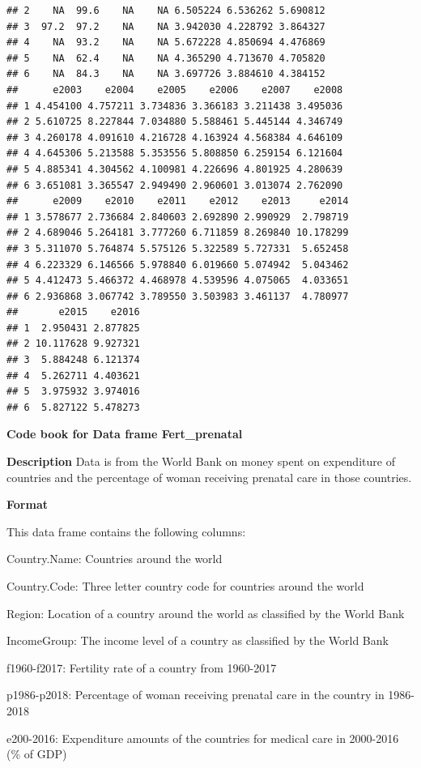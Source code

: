 \documentclass[
]{book}
\begin{document}
\begin{verbatim}
## 2    NA  99.6    NA    NA 6.505224 6.536262 5.690812
## 3  97.2  97.2    NA    NA 3.942030 4.228792 3.864327
## 4    NA  93.2    NA    NA 5.672228 4.850694 4.476869
## 5    NA  62.4    NA    NA 4.365290 4.713670 4.705820
## 6    NA  84.3    NA    NA 3.697726 3.884610 4.384152
##      e2003    e2004    e2005    e2006    e2007    e2008
## 1 4.454100 4.757211 3.734836 3.366183 3.211438 3.495036
## 2 5.610725 8.227844 7.034880 5.588461 5.445144 4.346749
## 3 4.260178 4.091610 4.216728 4.163924 4.568384 4.646109
## 4 4.645306 5.213588 5.353556 5.808850 6.259154 6.121604
## 5 4.885341 4.304562 4.100981 4.226696 4.801925 4.280639
## 6 3.651081 3.365547 2.949490 2.960601 3.013074 2.762090
##      e2009    e2010    e2011    e2012    e2013     e2014
## 1 3.578677 2.736684 2.840603 2.692890 2.990929  2.798719
## 2 4.689046 5.264181 3.777260 6.711859 8.269840 10.178299
## 3 5.311070 5.764874 5.575126 5.322589 5.727331  5.652458
## 4 6.223329 6.146566 5.978840 6.019660 5.074942  5.043462
## 5 4.412473 5.466372 4.468978 4.539596 4.075065  4.033651
## 6 2.936868 3.067742 3.789550 3.503983 3.461137  4.780977
##       e2015    e2016
## 1  2.950431 2.877825
## 2 10.117628 9.927321
## 3  5.884248 6.121374
## 4  5.262711 4.403621
## 5  3.975932 3.974016
## 6  5.827122 5.478273
\end{verbatim}

\textbf{Code book for Data frame Fert\_prenatal}

\textbf{Description}
Data is from the World Bank on money spent on expenditure of countries and the percentage of woman receiving prenatal care in those countries.

\textbf{Format}

This data frame contains the following columns:

Country.Name: Countries around the world

Country.Code: Three letter country code for countries around the world

Region: Location of a country around the world as classified by the World Bank

IncomeGroup: The income level of a country as classified by the World Bank

f1960-f2017: Fertility rate of a country from 1960-2017

p1986-p2018: Percentage of woman receiving prenatal care in the country in 1986-2018

e200-2016: Expenditure amounts of the countries for medical care in 2000-2016 (\% of GDP)
\end{document}
